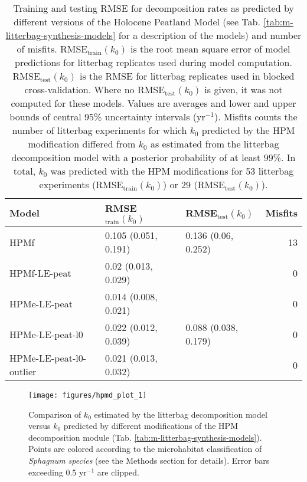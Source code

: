 \documentclass[
  12pt,
]{article}
\begin{document}
\begin{table}[!h]

\caption{\label{tab:out-tab-sdm-all-models-rmse-1}Training and testing RMSE for decomposition rates as predicted by different versions of the Holocene Peatland Model (see Tab. \ref{tab:m-litterbag-synthesis-models} for a description of the models) and number of misfits. RMSE\(_\text{train}(k_0)\) is the root mean square error of model predictions for litterbag replicates used during model computation. RMSE\(_\text{test}(k_0)\) is the RMSE for litterbag replicates used in blocked cross-validation. Where no RMSE\(_\text{test}(k_0)\) is given, it was not computed for these models. Values are averages and lower and upper bounds of central 95\% uncertainty intervals (yr\(^{-1}\)). Misfits counts the number of litterbag experiments for which \(k_0\) predicted by the HPM modification differed from \(k_0\) as estimated from the litterbag decomposition model with a posterior probability of at least 99\%. In total, \(k_0\) was predicted with the HPM modifications for 53 litterbag experiments (RMSE\(_\text{train}(k_0)\)) or 29 (RMSE\(_\text{test}(k_0)\)).}
\centering
\begin{tabular}[t]{lllr}
\toprule
Model & RMSE$_\text{train}(k_0)$ & RMSE$_\text{test}(k_0)$ & Misfits\\
\midrule
HPMf & 0.105 (0.051, 0.191) & 0.136 (0.06, 0.252) & 13\\
HPMf-LE-peat & 0.02 (0.013, 0.029) &  & 0\\
HPMe-LE-peat & 0.014 (0.008, 0.021) &  & 0\\
HPMe-LE-peat-l0 & 0.022 (0.012, 0.039) & 0.088 (0.038, 0.179) & 0\\
HPMe-LE-peat-l0-outlier & 0.021 (0.013, 0.032) &  & 0\\
\bottomrule
\end{tabular}
\end{table}



\begin{figure}[H]

{\centering \texttt{[image: figures/hpmd\_plot\_1]} 

}

\caption{Comparison of \(k_0\) estimated by the litterbag decomposition model versus \(k_0\) predicted by different modifications of the HPM decomposition module (Tab. \ref{tab:m-litterbag-synthesis-models}). Points are colored according to the microhabitat classification of \emph{Sphagnum species} (see the Methods section for details). Error bars exceeding 0.5 yr\(^{-1}\) are clipped.}\label{fig:out-p-hpm-mm27-2-mm29-1-mm30-1-p1}
\end{figure}
\end{document}
